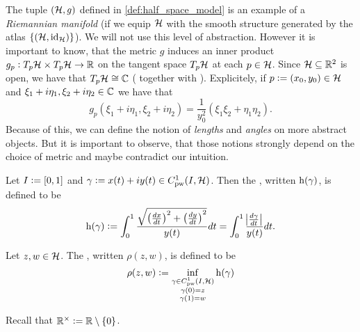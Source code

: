 \begin{remark}
	The tuple $(\mathcal{H},g)$ defined in \ref{def:half_space_model} is an example of a \emph{Riemannian manifold} (if we equip $\mathcal{H}$ with the smooth structure generated by the atlas $\cbr[0]{(\Hcal,\id_\Hcal)}$). We will not use this level of abstraction. However it is important to know, that the metric $g$ induces an inner product $g_p: T_p\mathcal{H} \times T_p\mathcal{H} \to \mathbb{R}$ on the tangent space $T_p\mathcal{H}$ at each $p \in \mathcal{H}$. Since $\mathcal{H} \subseteq \mathbb{R}^2$ is open, we have that $T_p\mathcal{H} \cong \mathbb{C}$ (\cite[56]{lee:smooth_manifolds:2013} together with \cite[53]{lee:smooth_manifolds:2013}). Explicitely, if $p := (x_0,y_0) \in \mathcal{H}$ and $\xi_1 + i\eta_1,\xi_2 + i\eta_2 \in \mathbb{C}$ we have that
	\begin{equation}
		g_p(\xi_1 + i\eta_1, \xi_2 + i\eta_2) = \frac{1}{y_0^2}(\xi_1\xi_2 + \eta_1\eta_2).
	\end{equation}
	Because of this, we can define the notion of \emph{lengths} and \emph{angles} on more abstract objects. But it is important to observe, that those notions strongly depend on the choice of metric and maybe contradict our intuition. 
\end{remark}

\begin{definition}
	Let $I := \intcc{0,1}$ and $\gamma := x(t) + iy(t) \in C^1_{\mathrm{pw}}(I,\mathcal{H})$. Then the , written $\operatorname{h}(\gamma)$, is defined to be
	\begin{equation}
		\h(\gamma) := \int_0^1 \frac{\sqrt{\del[1]{\frac{dx}{dt}}^2 + \del[1]{\frac{dy}{dt}}^2}}{y(t)} dt = \int_0^1 \frac{\abs[1]{\frac{d\gamma}{dt}}}{y(t)}dt.
	\end{equation}
\end{definition}

\begin{definition}
	Let $z,w \in \mathcal{H}$. The , written $\rho(z,w)$, is defined to be
	\begin{equation}
		\rho(z,w) := \inf_{\substack{\gamma \in C^1_{\mathrm{pw}}(I,\mathcal{H})\\ \gamma(0) = z\\ \gamma(1) = w}} \operatorname{h}(\gamma)
	\end{equation}
\end{definition}

Recall that $\Rbb^\times := \Rbb \setminus \cbr[0]{0}$.

